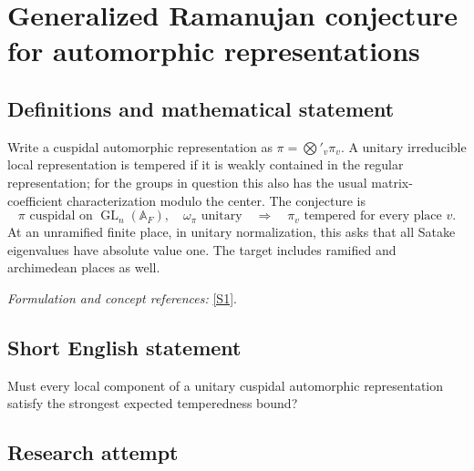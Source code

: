 \documentclass[11pt,a4paper]{article}
\newcommand{\A}{\mathbb{A}}
\newcommand{\sref}[2]{\hyperlink{source:#1:#2}{[S#2]}}
\newif\ifshowcatalogue
\newcommand{\cataloguescope}[1]{\ifshowcatalogue
 \paragraph{Exact scope in the supplied catalogue.}
 \begin{quote}\small #1\end{quote}\fi}
\numberwithin{equation}{section}
\begin{document}
\setcounter{section}{0}
\clearpage
\section*{\texorpdfstring{Generalized Ramanujan conjecture for automorphic representations}{Generalized Ramanujan conjecture for automorphic representations}}\label{statement}
\subsection{Definitions and mathematical statement}
Write a cuspidal automorphic representation as $\pi=\bigotimes'_v\pi_v$. A unitary irreducible local representation is tempered if it is weakly contained in the regular representation; for the groups in question this also has the usual matrix-coefficient characterization modulo the center. The conjecture is
\[
 \pi\text{ cuspidal on }\operatorname{GL}_n(\A_F),\quad
 \omega_\pi\text{ unitary}\quad\Longrightarrow\quad
 \pi_v\text{ tempered for every place }v.
\]
At an unramified finite place, in unitary normalization, this asks that all Satake eigenvalues have absolute value one. The target includes ramified and archimedean places as well.
\par\smallskip\textit{Formulation and concept references:} \sref{statement}{1}.
\cataloguescope{Prove that for every number field F and every cuspidal automorphic representation pi of GL\_n(A\_F) with unitary central character, each local component pi\_v is tempered at every place v.}
\subsection{Short English statement}
Must every local component of a unitary cuspidal automorphic representation satisfy the strongest expected temperedness bound?
\subsection{Research attempt}
\end{document}
